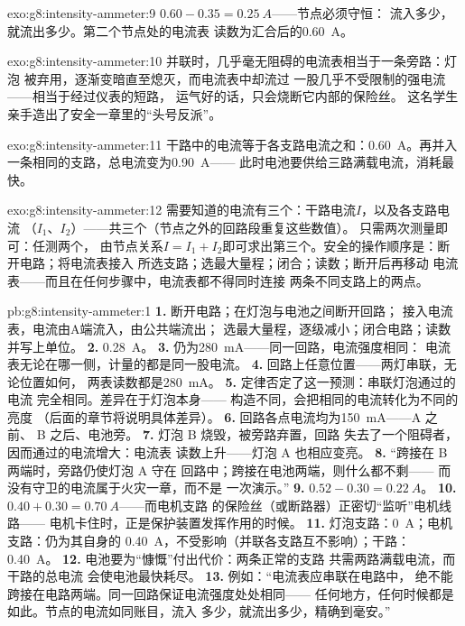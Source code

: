 \begin{solution}{exo:g8:intensity-ammeter:9}
$0.60 - 0.35 = \qty{0.25}{A}$——节点必须守恒：
流入多少，就流出多少。第二个节点处的电流表
读数为汇合后的\qty{0.60}{A}。
\end{solution}

\begin{solution}{exo:g8:intensity-ammeter:10}
并联时，几乎毫无阻碍的电流表相当于一条旁路：灯泡
被弃用，逐渐变暗直至熄灭，而电流表中却流过
一股几乎不受限制的强电流——相当于经过仪表的短路，
运气好的话，只会烧断它内部的保险丝。
这名学生亲手造出了安全一章里的“头号反派”。
\end{solution}

\begin{solution}{exo:g8:intensity-ammeter:11}
干路中的电流等于各支路电流之和：\qty{0.60}{A}。再并入
一条相同的支路，总电流变为\qty{0.90}{A}——
此时电池要供给三路满载电流，消耗最快。
\end{solution}

\begin{solution}{exo:g8:intensity-ammeter:12}
需要知道的电流有三个：干路电流$I$，以及各支路电流
（$I_1$、$I_2$）——共三个（节点之外的回路段重复这些数值）。
只需两次测量即可：任测两个，
由节点关系$I = I_1 + I_2$即可求出第三个。安全的操作顺序是：断开电路；将电流表接入
所选支路；选最大量程；闭合；读数；断开后再移动
电流表——而且在任何步骤中，电流表都不得同时连接
两条不同支路上的两点。
%
\end{solution}

\begin{solution}{pb:g8:intensity-ammeter:1}
\textbf{1.} 断开电路；在灯泡与电池之间断开回路；
接入电流表，电流由\unit{A}端流入，由公共端流出；
选最大量程，逐级减小；闭合电路；读数并写上单位。
\textbf{2.} \qty{0.28}{A}。
\textbf{3.} 仍为\qty{280}{mA}——同一回路，电流强度相同：
电流表无论在哪一侧，计量的都是同一股电流。
\textbf{4.} 回路上任意位置——两灯串联，无论位置如何，
两表读数都是\qty{280}{mA}。
\textbf{5.} 定律否定了这一预测：串联灯泡通过的电流
完全相同。差异在于灯泡本身——
构造不同，会把相同的电流转化为不同的亮度
（后面的章节将说明具体差异）。
\textbf{6.} 回路各点电流均为\qty{150}{mA}——A 之前、
B 之后、电池旁。
\textbf{7.} 灯泡 B 烧毁，被旁路弃置，回路
失去了一个阻碍者，因而通过的电流增大：电流表
读数上升——灯泡 A 也相应变亮。
\textbf{8.} “跨接在 B 两端时，旁路仍使灯泡 A 守在
回路中；跨接在电池两端，则什么都不剩——
而没有守卫的电流属于火灾一章，而不是
一次演示。”
\textbf{9.} $0.52 - 0.30 = \qty{0.22}{A}$。
\textbf{10.} $0.40 + 0.30 = \qty{0.70}{A}$——而电机支路
的保险丝（或断路器）正密切“监听”电机线路——
电机卡住时，正是保护装置发挥作用的时候。
\textbf{11.} 灯泡支路：\qty{0}{A}；电机支路：仍为其自身的
\qty{0.40}{A}，不受影响（并联各支路互不影响）；干路：
\qty{0.40}{A}。
\textbf{12.} 电池要为“慷慨”付出代价：两条正常的支路
共需两路满载电流，而干路的总电流
会使电池最快耗尽。
\textbf{13.} 例如：“电流表应串联在电路中，
绝不能跨接在电路两端。同一回路保证电流强度处处相同——
任何地方，任何时候都是如此。节点的电流如同账目，流入
多少，就流出多少，精确到毫安。”
\end{solution}
